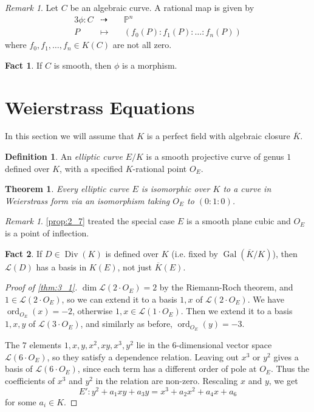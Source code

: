 \documentclass[11pt]{article}
\theoremstyle{definition}
\newtheorem*{definition*}{Definition}
\newtheorem*{fact}{Fact}
\theoremstyle{plain}
\newtheorem{theorem}[definition]{Theorem}
\theoremstyle{remark}
\newtheorem{remark}[definition]{Remark}
\newtheorem*{remark*}{Remark}
\DeclareMathOperator{\Gal}{Gal}
\DeclareMathOperator{\ord}{ord}
\DeclareMathOperator{\Div}{Div}
\newcommand{\PP}{\mathbb{P}}
\newcommand{\cL}{\mathcal{L}}
\begin{document}
\begin{remark}\label{rem:2_9}
    Let $C$ be an algebraic curve. A rational map is given by
    \begin{alignat*}{3}
        \phi : C &\dashrightarrow\,\,&& \PP^n\\
        P &\longmapsto&& (f_0(P) : f_1(P) : \ldots : f_n(P))
    \end{alignat*}
    where $f_0, f_1, \ldots, f_n \in K(C)$ are not all zero.
\end{remark}
\begin{fact}
    If $C$ is smooth, then $\phi$ is a morphism.
\end{fact}

\section{Weierstrass Equations}

In this section we will assume that $K$ is a perfect field with algebraic closure $\overline{K}$.

\begin{definition*}
    An \emph{elliptic curve} $E/K$ is a smooth projective curve of genus $1$ defined over $K$, with a specified $K$-rational point $O_E$.
\end{definition*}

\begin{theorem}\label{thm:3_1}
    Every elliptic curve $E$ is isomorphic over $K$ to a curve in Weierstrass form via an isomorphism taking $O_E$ to $(0:1:0)$.
\end{theorem}

\begin{remark*}
    \autoref{prop:2_7} treated the special case $E$ is a smooth plane cubic and $O_E$ is a point of inflection.
\end{remark*}

\begin{fact}
    If $D \in \Div(K)$ is defined over $K$ (i.e. fixed by $\Gal(\overline{K}/K)$), then $\cL(D)$ has a basis in $K(E)$, not just $\overline{K}(E)$.
\end{fact}

\begin{proof}[Proof of \autoref{thm:3_1}]
    $\dim \cL(2 \cdot O_E) = 2$ by the Riemann-Roch theorem, and $1 \in \cL(2 \cdot O_E)$, so we can extend it to a basis $1, x$ of $\cL(2 \cdot O_E)$. We have $\ord_{O_E}(x) = -2$, otherwise $1, x \in \cL(1 \cdot O_E)$. Then we extend it to a basis $1,x,y$ of $\cL(3 \cdot O_E)$, and similarly as before, $\ord_{O_E}(y) = -3$.

    The $7$ elements $1,x,y,x^2,xy,x^3,y^2$ lie in the $6$-dimensional vector space $\cL(6 \cdot O_E)$, so they satisfy a dependence relation. Leaving out $x^3$ or $y^2$ gives a basis of $\cL(6 \cdot O_E)$, since each term has a different order of pole at $O_E$. Thus the coefficients of $x^3$ and $y^2$ in the relation are non-zero. Rescaling $x$ and $y$, we get
    \begin{equation*}
        E' : y^2 + a_1xy + a_3 y = x^3 + a_2x^2 + a_4x + a_6
    \end{equation*}
    for some $a_i \in K$.
\end{proof}
\end{document}
